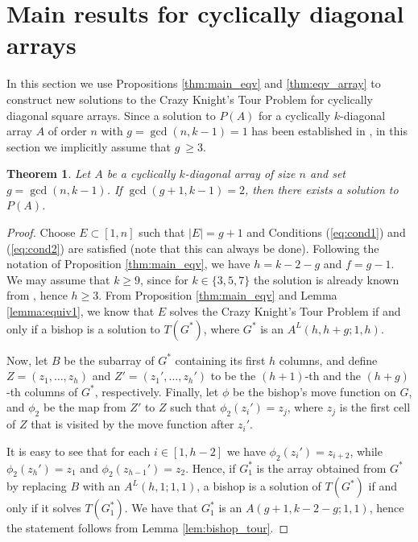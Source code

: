 \documentclass{amsart}
\newtheorem{thm}[prop]{Theorem}
\theoremstyle{definition}
\numberwithin{equation}{section}
\begin{document}
\section{Main results for cyclically diagonal arrays} \label{sec:new_sol}
In this section we use Propositions \ref{thm:main_eqv} and \ref{thm:eqv_array} to construct new solutions to the Crazy Knight's Tour Problem for cyclically diagonal square arrays. 
Since a solution to $P(A)$ for a cyclically $k$-diagonal array $A$ of order $n$ with $g = \gcd(n,k-1)=1$ has been established in  \cite{CDP}, in this section we implicitly assume that $g\ \geq 3$.

\begin{thm} \label{prop:case1}
Let  $A$ be a cyclically $k$-diagonal array of size $n$ and set $g = \gcd(n,k-1)$.
If $\gcd(g+1,k-1)=2$, then there exists a solution to $P(A)$.
\end{thm}
\begin{proof}
Choose $E\subset [1,n]$ such that $|E| = g+1$ and Conditions (\ref{eq:cond1}) and (\ref{eq:cond2}) are satisfied (note that this can always be done). 
Following  the notation of Proposition \ref{thm:main_eqv}, we have $h = k-2-g$ and $f =g-1$.  We may assume that $k\geq 9$, since for $k \in\{3,5,7\}$ the solution is already known from \cite{CDP}, hence $h \geq 3$. From Proposition \ref{thm:main_eqv} and Lemma \ref{lemma:equiv1}, we know that $E$ solves the Crazy Knight's Tour Problem if and only if a bishop is a solution to $T(G^*)$, where $G^*$ is an $A^{L}(h,h+g;1,h)$. 

Now, let $B$ be the subarray of $G^*$ containing its first $h$ columns, and  define  $Z = (z_1, \dotsc, z_h)$ and $Z' = (z_1', \dotsc, z_h')$ to be the $(h+1)$-th and the $(h+g)$-th columns of $G^*$, respectively. Finally, let $\phi$ be the bishop's move function on $G$, and $\phi_2$ be the map from $Z'$ to $Z$ such that $\phi_2(z_i') = z_j$,
where $z_j$ is the first cell of $Z$ that is visited by the move function after $z_i'$. 

It is easy to see that for each $i \in [1,h-2]$ we have $\phi_2(z_i') = z_{i+2}$, while $\phi_2(z_h') = z_1$ and $\phi_2(z_{h-1}') = z_2$. Hence, if $G^*_1$ is the array obtained from $G^*$ by replacing $B$ with an $A^{L}(h,1;1,1)$, a bishop is a solution of $T(G^*)$ if and only if it solves $T(G^*_1)$. We have that $G^*_1$ is an $A(g+1,k-2-g;1,1)$, hence the statement  follows from Lemma \ref{lem:bishop_tour}.
\end{proof}
\end{document}
